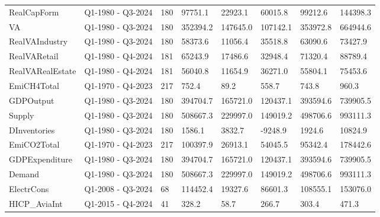 \begin{longtable}[t]{llllllll}
RealCapForm & Q1-1980 - Q3-2024 & 180 & 97751.1 & 22923.1 & 60015.8 & 99212.6 & 144398.3\\
\addlinespace
VA & Q1-1980 - Q3-2024 & 180 & 352394.2 & 147645.0 & 107142.1 & 353972.8 & 664944.6\\
RealVAIndustry & Q1-1980 - Q3-2024 & 180 & 58373.6 & 11056.4 & 35518.8 & 63090.6 & 73427.9\\
RealVARetail & Q1-1980 - Q4-2024 & 181 & 65243.9 & 17486.6 & 32948.4 & 71320.4 & 88789.4\\
RealVARealEstate & Q1-1980 - Q4-2024 & 181 & 56040.8 & 11654.9 & 36271.0 & 55804.1 & 75453.6\\
EmiCH4Total & Q1-1970 - Q4-2023 & 217 & 752.4 & 89.2 & 558.7 & 743.8 & 960.3\\
\addlinespace
GDPOutput & Q1-1980 - Q3-2024 & 180 & 394704.7 & 165721.0 & 120437.1 & 393594.6 & 739905.5\\
Supply & Q1-1980 - Q3-2024 & 180 & 508667.3 & 229997.0 & 149019.2 & 498706.6 & 993111.3\\
DInventories & Q1-1980 - Q3-2024 & 180 & 1586.1 & 3832.7 & -9248.9 & 1924.6 & 10824.9\\
EmiCO2Total & Q1-1970 - Q4-2023 & 217 & 100397.9 & 26913.1 & 54045.5 & 95342.4 & 178442.6\\
GDPExpenditure & Q1-1980 - Q3-2024 & 180 & 394704.7 & 165721.0 & 120437.1 & 393594.6 & 739905.5\\
\addlinespace
Demand & Q1-1980 - Q3-2024 & 180 & 508667.3 & 229997.0 & 149019.2 & 498706.6 & 993111.3\\
ElectrCons & Q1-2008 - Q3-2024 & 68 & 114452.4 & 19327.6 & 86601.3 & 108555.1 & 153076.0\\
HICP\_AviaInt & Q1-2015 - Q4-2024 & 41 & 328.2 & 58.7 & 266.7 & 303.4 & 471.3\\
\bottomrule
\end{longtable}
\endgroup{}

